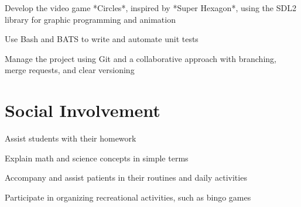 \documentclass[letterpaper,10pt]{article}
\begin{document}
  \begin{resume_list}
    \item Develop the video game *Circles*, inspired by *Super Hexagon*, using the SDL2 library for graphic programming and animation
    \vspace{2pt}
    \item Use Bash and BATS to write and automate unit tests
    \vspace{2pt}
    \item Manage the project using Git and a collaborative approach with branching, merge requests, and clear versioning
  \end{resume_list}
  

  \section{Social Involvement}

  \begin{resume_list}
    \item Assist students with their homework
    \item Explain math and science concepts in simple terms
  \end{resume_list}
  
\begin{resume_list}
    \item Accompany and assist patients in their routines and daily activities
    \item Participate in organizing recreational activities, such as bingo games
\end{resume_list}
\end{document}
